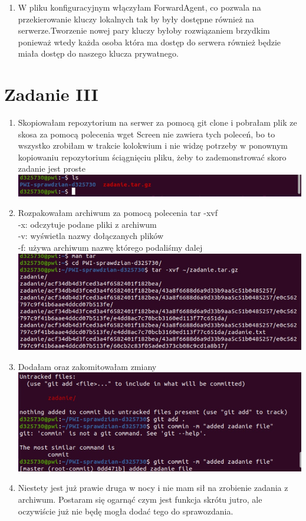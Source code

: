 \documentclass[12pt]{article}
\begin{document}
\begin{enumerate}
    \item W pliku konfiguracyjnym włączyłam ForwardAgent, co pozwala na przekierowanie kluczy lokalnych tak by były dostępne również na serwerze.Tworzenie nowej pary kluczy byłoby rozwiązaniem brzydkim ponieważ wtedy każda osoba która ma dostęp do serwera również będzie miała dostęp do naszego klucza prywatnego. 
\end{enumerate}
\section*{Zadanie III}
\begin{enumerate}
    \item Skopiowałam repozytorium na serwer za pomocą git clone i pobrałam plik ze skosa za pomocą polecenia wget
    Screen nie zawiera tych poleceń, bo to wszystko zrobiłam w trakcie kolokwium i nie widzę potrzeby w ponownym kopiowaniu repozytorium ściągnięciu pliku, żeby to zademonstrować skoro zadanie jest proste
    \includegraphics[scale = 0.8]{5.jpg}
    \item Rozpakowałam archiwum za pomocą polecenia tar -xvf \\
    -x: odczytuje podane pliki z archiwum\\
    -v: wyświetla nazwy dołączanych plików \\
    -f: używa archiwum nazwę którego podaliśmy dalej\\
    \includegraphics[scale = 0.8]{6.jpg}
    \item Dodałam oraz zakomitowałam zmiany\\
    \includegraphics[scale = 0.8]{7.jpg}
    \item Niestety jest już prawie druga w nocy i nie mam sił na zrobienie zadania z archiwum. Postaram się ogarnąć czym jest funkcja skrótu jutro, ale oczywiście już nie będę mogła dodać tego do sprawozdania. 
\end{enumerate}
\end{document}
